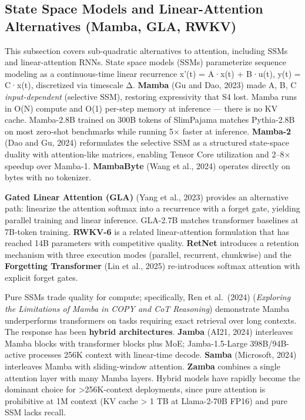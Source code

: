 \subsection{State Space Models and Linear-Attention Alternatives (Mamba, GLA, RWKV)}\label{state-space-models-and-linear-attention-alternatives-mamba-gla-rwkv}

This subsection covers sub-quadratic alternatives to attention, including SSMs and linear-attention RNNs. State space models (SSMs) parameterize sequence modeling as a continuous-time linear recurrence x'(t) = A·x(t) + B·u(t), y(t) = C·x(t), discretized via timescale Δ. \textbf{Mamba} (Gu and Dao, 2023) made A, B, C \emph{input-dependent} (selective SSM), restoring expressivity that S4 lost. Mamba runs in O(N) compute and O(1) per-step memory at inference --- there is no KV cache. Mamba-2.8B trained on 300B tokens of SlimPajama matches Pythia-2.8B on most zero-shot benchmarks while running 5× faster at inference. \textbf{Mamba-2} (Dao and Gu, 2024) reformulates the selective SSM as a structured state-space duality with attention-like matrices, enabling Tensor Core utilization and 2--8× speedup over Mamba-1. \textbf{MambaByte} (Wang et al., 2024) operates directly on bytes with no tokenizer.

\textbf{Gated Linear Attention (GLA)} (Yang et al., 2023) provides an alternative path: linearize the attention softmax into a recurrence with a forget gate, yielding parallel training and linear inference. GLA-2.7B matches transformer baselines at 7B-token training. \textbf{RWKV-6} is a related linear-attention formulation that has reached 14B parameters with competitive quality. \textbf{RetNet} introduces a retention mechanism with three execution modes (parallel, recurrent, chunkwise) and the \textbf{Forgetting Transformer} (Lin et al., 2025) re-introduces softmax attention with explicit forget gates.

Pure SSMs trade quality for compute; specifically, Ren et al.~(2024) (\emph{Exploring the Limitations of Mamba in COPY and CoT Reasoning}) demonstrate Mamba underperforms transformers on tasks requiring exact retrieval over long contexts. The response has been \textbf{hybrid architectures}. \textbf{Jamba} (AI21, 2024) interleaves Mamba blocks with transformer blocks plus MoE; Jamba-1.5-Large 398B/94B-active processes 256K context with linear-time decode. \textbf{Samba} (Microsoft, 2024) interleaves Mamba with sliding-window attention. \textbf{Zamba} combines a single attention layer with many Mamba layers. Hybrid models have rapidly become the dominant choice for \textgreater256K-context deployments, since pure attention is prohibitive at 1M context (KV cache \textgreater{} 1 TB at Llama-2-70B FP16) and pure SSM lacks recall.

